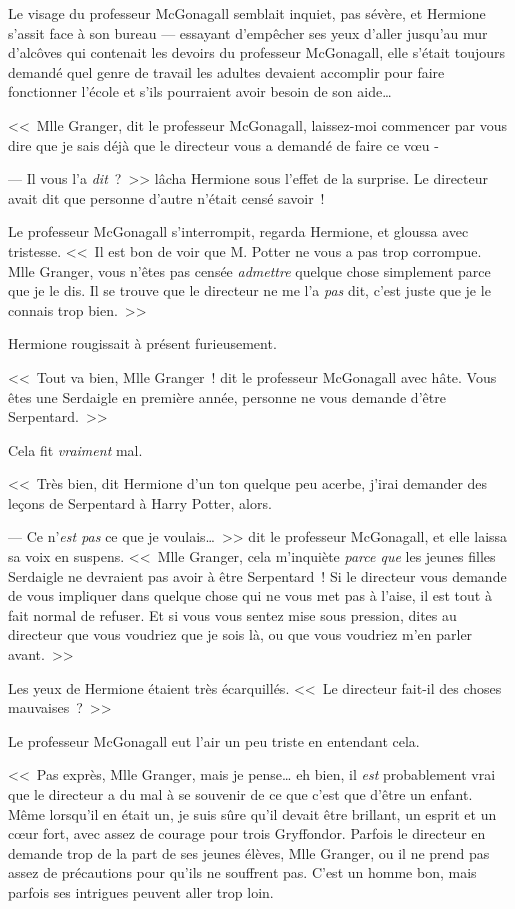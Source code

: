 Le visage du professeur McGonagall semblait inquiet, pas sévère, et Hermione s'assit face à son bureau — essayant d'empêcher ses yeux d'aller jusqu'au mur d'alcôves qui contenait les devoirs du professeur McGonagall, elle s'était toujours demandé quel genre de travail les adultes devaient accomplir pour faire fonctionner l'école et s'ils pourraient avoir besoin de son aide…

<<~Mlle Granger, dit le professeur McGonagall, laissez-moi commencer par vous dire que je sais déjà que le directeur vous a demandé de faire ce vœu -

--- Il vous l'a \emph{dit}~?~>> lâcha Hermione sous l'effet de la surprise. Le directeur avait dit que personne d'autre n'était censé savoir~!

Le professeur McGonagall s'interrompit, regarda Hermione, et gloussa avec tristesse. <<~Il est bon de voir que M. Potter ne vous a pas trop corrompue. Mlle Granger, vous n'êtes pas censée \emph{admettre} quelque chose simplement parce que je le dis. Il se trouve que le directeur ne me l'a \emph{pas} dit, c'est juste que je le connais trop bien.~>>

Hermione rougissait à présent furieusement.

<<~Tout va bien, Mlle Granger~! dit le professeur McGonagall avec hâte. Vous êtes une Serdaigle en première année, personne ne vous demande d'être Serpentard.~>>

Cela fit \emph{vraiment} mal.

<<~Très bien, dit Hermione d'un ton quelque peu acerbe, j'irai demander des leçons de Serpentard à Harry Potter, alors.

--- Ce n'\emph{est pas} ce que je voulais…~>> dit le professeur McGonagall, et elle laissa sa voix en suspens. <<~Mlle Granger, cela m'inquiète \emph{parce que} les jeunes filles Serdaigle ne devraient pas avoir à être Serpentard~! Si le directeur vous demande de vous impliquer dans quelque chose qui ne vous met pas à l'aise, il est tout à fait normal de refuser. Et si vous vous sentez mise sous pression, dites au directeur que vous voudriez que je sois là, ou que vous voudriez m'en parler avant.~>>

Les yeux de Hermione étaient très écarquillés. <<~Le directeur fait-il des choses mauvaises~?~>>

Le professeur McGonagall eut l'air un peu triste en entendant cela.

<<~Pas exprès, Mlle Granger, mais je pense… eh bien, il \emph{est} probablement vrai que le directeur a du mal à se souvenir de ce que c'est que d'être un enfant. Même lorsqu'il en était un, je suis sûre qu'il devait être brillant, un esprit et un cœur fort, avec assez de courage pour trois Gryffondor. Parfois le directeur en demande trop de la part de ses jeunes élèves, Mlle Granger, ou il ne prend pas assez de précautions pour qu'ils ne souffrent pas. C'est un homme bon, mais parfois ses intrigues peuvent aller trop loin.

